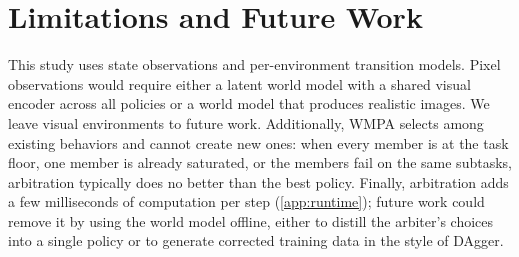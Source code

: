 \documentclass{article}
\theoremstyle{plain}
\theoremstyle{definition}
\theoremstyle{plain}
\newcommand{\wmpa}{\textsc{WMPA}}
\begin{document}
\section{Limitations and Future Work}

\label{sec:limitations}
This study uses state observations and per-environment transition models. Pixel observations would require either a latent world model with a shared visual encoder across all policies or a world model that produces realistic images. We leave visual environments to future work. Additionally, \wmpa{} selects among existing behaviors and cannot create new ones: when every member is at the task floor, one member is already saturated, or the members fail on the same subtasks, arbitration typically does no better than the best policy.
Finally, arbitration adds a few milliseconds of computation per step (\cref{app:runtime}); future work could remove it by using the world model offline, either to distill the arbiter's choices into a single policy or to generate corrected training data in the style of DAgger.
\end{document}
